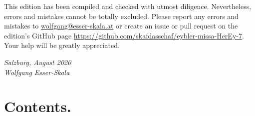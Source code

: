 \documentclass[parskip=full]{scrreprt}
\newif\iftemplate\templatetrue
\begin{document}
This edition has been compiled and checked with utmost diligence. Nevertheless, errors and mistakes cannot be totally excluded. Please report any errors and mistakes to \url{wolfgang@esser-skala.at} or create an issue or pull request on the edition’s GitHub page \url{https://github.com/skafdasschaf/eybler-missa-HerEy-7}. Your help will be greatly appreciated.

\bigskip
\textit{Salzburg, August 2020\\
Wolfgang Esser-Skala}

\cleardoublepage
\chapter*{Contents.}


\cleardoublepage
\fi

\iftemplate

\fi
\end{document}
